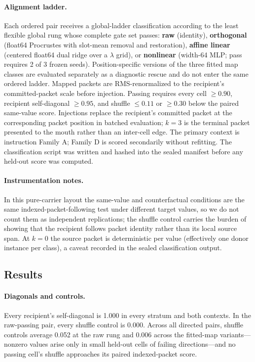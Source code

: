 \documentclass[11pt]{article}
\begin{document}
\paragraph{Alignment ladder.} Each ordered pair receives a global-ladder classification according to the least flexible global rung whose complete gate set passes: \textbf{raw} (identity), \textbf{orthogonal} (float64 Procrustes with slot-mean removal and restoration), \textbf{affine linear} (centered float64 dual ridge over a $\lambda$ grid), or \textbf{nonlinear} (width-64 MLP; pass requires 2 of 3 frozen seeds). Position-specific versions of the three fitted map classes are evaluated separately as a diagnostic rescue and do not enter the same ordered ladder. Mapped packets are RMS-renormalized to the recipient's committed-packet scale before injection. Passing requires every cell $\geq0.90$, recipient self-diagonal $\geq0.95$, and shuffle $\leq0.11$ or $\geq0.30$ below the paired same-value score. Injections replace the recipient's committed packet at the corresponding packet position in batched evaluation; $k{=}3$ is the terminal packet presented to the mouth rather than an inter-cell edge. The primary context is instruction Family A; Family D is scored secondarily without refitting. The classification script was written and hashed into the sealed manifest before any held-out score was computed.

\paragraph{Instrumentation notes.} In this pure-carrier layout the same-value and counterfactual conditions are the same indexed-packet-following test under different target values, so we do not count them as independent replications; the shuffle control carries the burden of showing that the recipient follows packet identity rather than its local source span. At $k=0$ the source packet is deterministic per value (effectively one donor instance per class), a caveat recorded in the sealed classification output.

\subsection{Results}\label{sec:p1results}

\paragraph{Diagonals and controls.} Every recipient's self-diagonal is 1.000 in every stratum and both contexts. In the raw-passing pair, every shuffle control is 0.000. Across all directed pairs, shuffle controls average 0.052 at the raw rung and 0.006 across the fitted-map variants---nonzero values arise only in small held-out cells of failing directions---and no passing cell's shuffle approaches its paired indexed-packet score.
\end{document}
